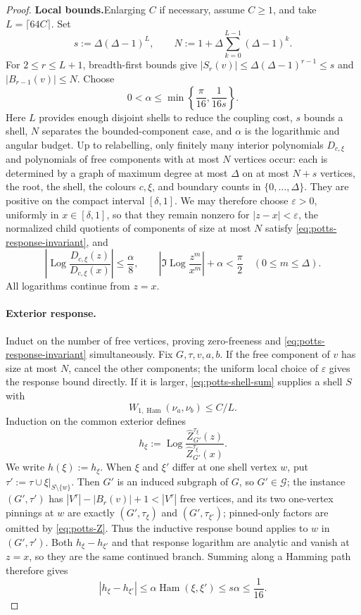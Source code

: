 \documentclass[11pt,reqno]{article}
\theoremstyle{plain}
\theoremstyle{definition}
\theoremstyle{remark}
\theoremstyle{definition}
\theoremstyle{remark}
\newcommand{\eps}{\varepsilon}
\newcommand{\Log}{\operatorname{Log}}          %
\DeclareMathOperator{\Ham}{Ham}
\newcommand{\Deg}{\Delta}                        %
\newcommand{\WHam}{W_{1,\Ham}}                   %
\newcommand{\nZpin}[2]{\widehat Z_{#1}^{#2}}
\begin{document}
\begin{proof}
\textbf{Local bounds.}\hspace{1em}Enlarging \(C\) if necessary, assume \(C\ge1\), and take
\(L=\lceil64C\rceil\).  Set
\[
  s:=\Deg(\Deg-1)^L,
  \qquad
  N:=1+\Deg\sum_{k=0}^{L-1}(\Deg-1)^k.
\]
For \(2\le r\le L+1\), breadth-first bounds give
\( |S_r(v)|\le\Deg(\Deg-1)^{r-1}\le s\) and
\( |B_{r-1}(v)|\le N\).  Choose
\[
  0<\alpha\le\min\left\{\frac\pi{16},\frac1{16s}\right\}.
\]
Here \(L\) provides enough disjoint shells to reduce the coupling cost,
\(s\) bounds a shell, \(N\) separates the bounded-component case, and
\(\alpha\) is the logarithmic and angular budget.
Up to relabelling, only finitely many interior polynomials \(D_{c,\xi}\)
and polynomials of free components with at most \(N\) vertices occur: each is
determined by a graph of maximum degree at most \(\Deg\) on at most
\(N+s\) vertices, the root, the shell, the colours \(c,\xi\), and
boundary counts in \(\{0,\ldots,\Deg\}\).  They are positive on the compact
interval \([\delta,1]\).  We may therefore choose \(\eps>0\), uniformly in
\(x\in[\delta,1]\), so that they remain nonzero for \(|z-x|<\eps\),
the normalized child quotients of components of size at most \(N\)
satisfy \eqref{eq:potts-response-invariant}, and
\begin{equation}\label{eq:potts-local-budget}
  \left|\Log\frac{D_{c,\xi}(z)}{D_{c,\xi}(x)}\right|
  \le\frac\alpha8,
  \qquad
  \left|\Im\Log\frac{z^m}{x^m}\right|+\alpha<\frac\pi2
  \quad(0\le m\le\Deg).
\end{equation}
All logarithms continue from \(z=x\).

\paragraph{Exterior response.}
Induct on the number of free vertices, proving zero-freeness and
\eqref{eq:potts-response-invariant} simultaneously.  Fix \(G,\tau,v,a,b\).
If the free component of \(v\) has size at most \(N\), cancel the other
components; the uniform local choice of \(\eps\) gives the response bound
directly.  If it is larger, \eqref{eq:potts-shell-sum} supplies a shell
\(S\) with
\[
  \WHam(\nu_a,\nu_b)\le C/L.
\]
Induction on the common exterior defines
\[
  h_\xi:=\Log
  \frac{\nZpin{G'}{\tau_\xi}(z)}
       {\nZpin{G'}{\tau_\xi}(x)}.
\]
We write \(h(\xi):=h_\xi\).  When \(\xi\) and \(\xi'\) differ at one shell vertex \(w\), put
\(\tau':=\tau\cup\xi|_{S\setminus\{w\}}\).  Then \(G'\) is an induced
subgraph of \(G\), so \(G'\in\mathcal G\); the instance \((G',\tau')\) has
\(|V^\tau|-|B_r(v)|+1<|V^\tau|\) free vertices, and its two one-vertex
pinnings at \(w\) are exactly \((G',\tau_\xi)\) and \((G',\tau_{\xi'})\);
pinned-only factors are omitted by \eqref{eq:potts-Z}.  Thus the
inductive response bound applies to \(w\) in \((G',\tau')\).  Both
\(h_\xi-h_{\xi'}\) and that response logarithm are analytic and vanish at
\(z=x\), so they are the same continued branch.  Summing along a Hamming
path therefore gives
\[
  |h_\xi-h_{\xi'}|
  \le\alpha\Ham(\xi,\xi')
  \le s\alpha
  \le\frac1{16}.
\]

\end{proof}
\end{document}
